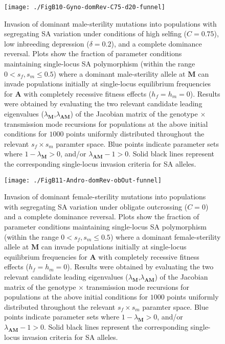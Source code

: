 \documentclass{article}
\begin{document}
\begin{figure}[ht!]
\centering
\texttt{[image: ./FigB10-Gyno-domRev-C75-d20-funnel]}
\caption{Invasion of dominant male-sterility mutations into populations with segregating SA variation under conditions of high selfing ($C = 0.75$), low inbreeding depression ($\delta = 0.2$), and a complete dominance reversal. Plots show the fraction of parameter conditions maintaining single-locus SA polymorphism (within the range $0 < s_f,s_m \leq 0.5$) where a dominant male-sterility allele at $\mathbf{M}$ can invade populations initially at single-locus equilibrium frequencies for $\mathbf{A}$ with completely recessive fitness effects ($h_f=h_m=0$). Results were obtained by evaluating the two relevant candidate leading eigenvalues ($\lambda_{\mathbf{M}}$,$\lambda_{\mathbf{AM}}$) of the Jacobian matrix of the genotype $\times$ transmission mode recursions for populations at the above initial conditions for $1000$ points uniformly distributed throughout the relevant $s_f \times s_m$ paramter space. Blue points indicate parameter sets where $1 - \lambda_{\mathbf{M}} > 0$, and/or $\lambda_{\mathbf{AM}} - 1 > 0$. Solid black lines represent the corresponding single-locus invasion criteria for SA alleles.}
\label{fig:GynC75d20FunnelDomRev}
\end{figure}
\newpage{}

\begin{figure}[ht!]
\centering
\texttt{[image: ./FigB11-Andro-domRev-obOut-funnel]}
\caption{Invasion of dominant female-sterility mutations into populations with segregating SA variation under obligate outcrossing ($C=0$) and a complete dominance reversal. Plots show the fraction of parameter conditions maintaining single-locus SA polymorphism (within the range $0 < s_f,s_m \leq 0.5$) where a dominant female-sterility allele at $\mathbf{M}$ can invade populations initially at single-locus equilibrium frequencies for $\mathbf{A}$ with completely recessive fitness effects ($h_f=h_m=0$). Results were obtained by evaluating the two relevant candidate leading eigenvalues ($\lambda_{\mathbf{M}}$,$\lambda_{\mathbf{AM}}$) of the Jacobian matrix of the genotype $\times$ transmission mode recursions for populations at the above initial conditions for $1000$ points uniformly distributed throughout the relevant $s_f \times s_m$ paramter space. Blue points indicate parameter sets where $1 - \lambda_{\mathbf{M}} > 0$, and/or $\lambda_{\mathbf{AM}} - 1 > 0$. Solid black lines represent the corresponding single-locus invasion criteria for SA alleles.}
\label{fig:AndObOutFunnelDomRev}
\end{figure}
\newpage{}
\end{document}
